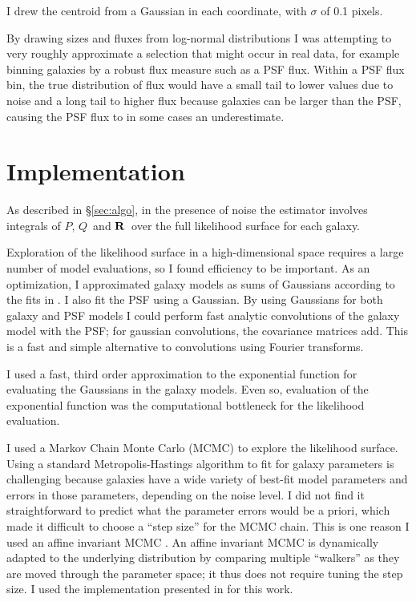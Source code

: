 \documentclass[12pt,preprint]{aastex}
\newcommand{\vecQ}{\mbox{\boldmath $Q$}}
\newcommand{\matR}{\mbox{$\bf R$}}
\begin{document}
I drew the centroid from a Gaussian in each coordinate, with $\sigma$ of 0.1
pixels.  

By drawing sizes and fluxes from log-normal distributions I was attempting to
very roughly approximate a selection that might occur in real data, for example
binning galaxies by a robust flux measure such as a PSF flux.  Within a PSF
flux bin, the true distribution of flux would have a small tail to lower values
due to noise and a long tail to higher flux because galaxies can be larger than
the PSF, causing the PSF flux to in some cases an underestimate.

\section{Implementation} \label{sec:impl}

As described in \S \ref{sec:algo}, in the presence of noise the estimator
involves integrals of $P$, \vecQ\ and \matR\ over the full likelihood surface
for each galaxy.

Exploration of the likelihood surface in a high-dimensional space requires a
large number of model evaluations, so I found efficiency to be important.  As
an optimization, I approximated galaxy models as sums of Gaussians according to
the fits in \citet{HoggGMix}.  I also fit the PSF using a Gaussian.  By using
Gaussians for both galaxy and PSF models I could perform fast analytic
convolutions of the galaxy model with the PSF; for gaussian convolutions, the
covariance matrices add.  This is a fast and simple alternative to convolutions
using Fourier transforms.

I used a fast, third order approximation to the exponential function for
evaluating the Gaussians in the galaxy models.  Even so, evaluation of the
exponential function was the computational bottleneck for the likelihood
evaluation.

I used a Markov Chain Monte Carlo (MCMC) to explore the likelihood surface.
Using a standard Metropolis-Hastings algorithm \citep{Metropolis53}  to fit for
galaxy parameters is challenging because galaxies have a wide variety of
best-fit model parameters and errors in those parameters, depending on the
noise level.  I did not find it straightforward to predict what the parameter
errors would be a priori, which made it difficult to choose a ``step size'' for
the MCMC chain.  This is one reason I used an affine invariant MCMC
\citep{GoodmanWeare10}.  An affine invariant MCMC is dynamically adapted to the
underlying distribution by comparing multiple ``walkers'' as they are moved
through the parameter space; it thus does not require tuning the step size.  I
used the implementation presented in \citet{Mackey13} for this work.
\end{document}
